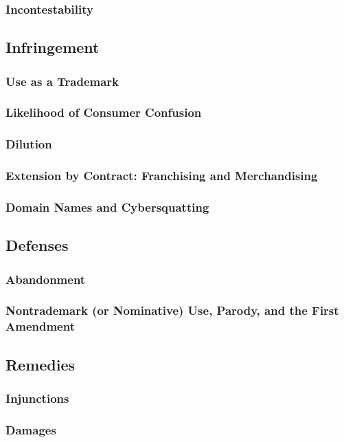 \subsubsection{Incontestability}


\subsection{Infringement}

\subsubsection{Use as a Trademark}


\subsubsection{Likelihood of Consumer Confusion}


\subsubsection{Dilution}


\subsubsection{Extension by Contract: Franchising and Merchandising}


\subsubsection{Domain Names and Cybersquatting}


\subsection{Defenses}

\subsubsection{Abandonment}


\subsubsection{Nontrademark (or Nominative) Use, Parody, and the First 
Amendment}


\subsection{Remedies}

\subsubsection{Injunctions}


\subsubsection{Damages}

